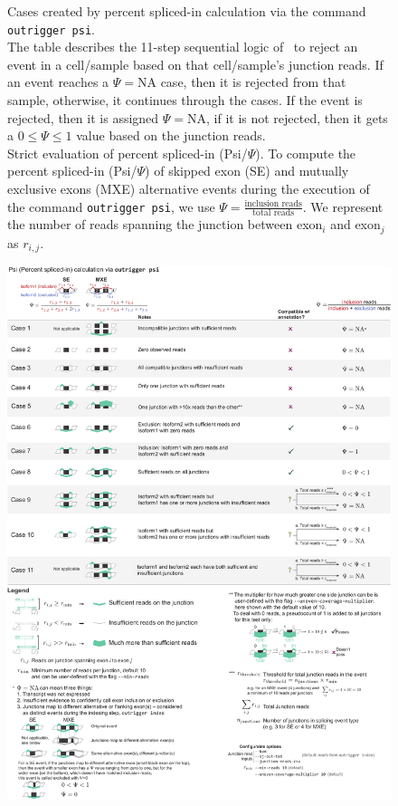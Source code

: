 \clearpage
\thispagestyle{facingcaption}
\begin{figure}[h]
\captionsetup{labelformat=prev-page}
  \caption[Cases created by percent spliced-in calculation via the command \texttt{outrigger psi}.]{
  Cases created by percent spliced-in calculation via the command \texttt{outrigger psi}.\\
The table describes the 11-step sequential logic of \outrigger\, to reject an event in a cell/sample based on that cell/sample's junction reads. If an event reaches a $\Psi=\text{NA}$ case, then it is rejected from that sample, otherwise, it continues through the cases. If the event is rejected, then it is assigned $\Psi = \text{NA}$, if it is not rejected, then it gets a $0\leq \Psi \leq 1$ value based on the junction reads.\\
Strict evaluation of percent spliced-in (Psi/$\Psi$). To compute the percent spliced-in (Psi/$\Psi$) of skipped exon (SE) and mutually exclusive exons (MXE) alternative events during the execution of the command \texttt{outrigger psi}, we use $\Psi= \frac{\text{inclusion reads}}{\text{total reads}}$. We represent the number of reads spanning the junction between exon$_i$ and exon$_j$ as $r_{i,j}$.
}
\label{fig:outrigger_psi}

\end{figure}
\clearpage
\begin{figure}[h]
\ContinuedFloat
\captionsetup{labelformat=empty}
\centering
  \includegraphics[width=5.8in]{figures/outrigger_psi}
\end{figure}
